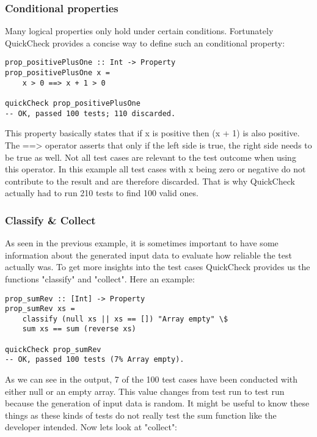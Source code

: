 \documentclass[a4paper, 12pt]{article} %
\begin{document}
\subsubsection{Conditional properties}

Many logical properties only hold under certain conditions. Fortunately QuickCheck provides a concise way to define such an conditional property:

\begin{verbatim}
prop_positivePlusOne :: Int -> Property
prop_positivePlusOne x = 
    x > 0 ==> x + 1 > 0

quickCheck prop_positivePlusOne  
-- OK, passed 100 tests; 110 discarded.
\end{verbatim}

This property basically states that if x is positive then (x + 1) is also positive. The ==\textgreater{} operator asserts that only if the left side is true, the right side needs to be true as well. \cite{Claessen2000} Not all test cases are relevant to the test outcome when using this operator. In this example all test cases with x being zero or negative do not contribute to the result and are therefore discarded. That is why QuickCheck actually had to run 210 tests to find 100 valid ones.  

\subsubsection{Classify \& Collect}

As seen in the previous example, it is sometimes important to have some information about the generated input data to evaluate how reliable the test actually was. To get more insights into the test cases QuickCheck provides us the functions "classify" and "collect". \cite{Claessen2000} Here an example:

\begin{verbatim}
prop_sumRev :: [Int] -> Property
prop_sumRev xs = 
    classify (null xs || xs == []) "Array empty" \$
    sum xs == sum (reverse xs)

quickCheck prop_sumRev
-- OK, passed 100 tests (7% Array empty).
\end{verbatim}

As we can see in the output, 7 of the 100 test cases have been conducted with either null or an empty array. This value changes from test run to test run because the generation of input data is random. It might be useful to know these things as these kinds of tests do not really test the sum function like the developer intended. Now lets look at "collect":
\end{document}
